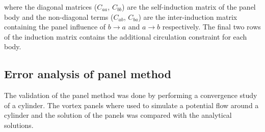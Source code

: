 where the diagonal matrices ($C_{aa}$, $C_{bb}$) are the self-induction matrix of the panel body and the non-diagonal terms ($C_{ab}$, $C_{ba}$) are the inter-induction matrix containing the panel influence of $b\rightarrow a$ and $a\rightarrow b$ respectively. The final two rows of the induction matrix contains the additional circulation constraint for each body.



%
\subsection{Error analysis of panel method}
The validation of the panel method was done by performing a convergence study of a cylinder. The vortex panels where used to simulate a potential flow around a cylinder and the solution of the panels was compared with the analytical solutions.


